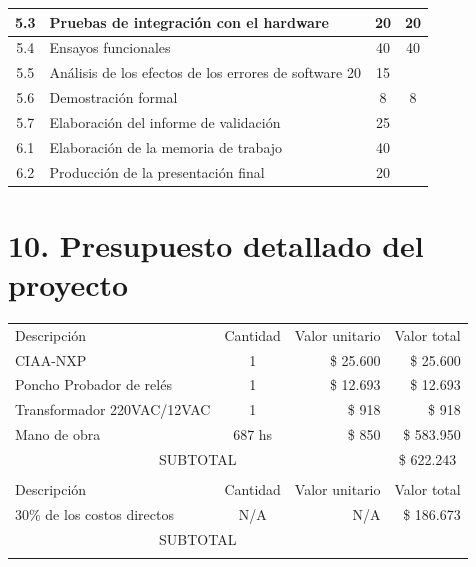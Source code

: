 \documentclass[11pt]{charter}
\begin{document}
\begin{table}[H]
\begin{tabularx}{\linewidth}{@{}|c|X|c|c|@{}}
 5.3 & Pruebas de integración con el hardware & 20 & 20 \\ \hline
 5.4 & Ensayos funcionales & 40 & 40 \\ \hline
 5.5 & Análisis de los efectos de los errores de software 20 & 15 & \\ \hline
 5.6 & Demostración formal & 8 & 8 \\ \hline
 5.7 & Elaboración del informe de validación & 25 & \\ \hline 
 6.1 & Elaboración de la memoria de trabajo & 40 & \\ \hline 
 6.2 & Producción de la presentación final & 20 & \\ \hline 
\end{tabularx}%
\end{table}


\section{10. Presupuesto detallado del proyecto}
\label{sec:presupuesto}

\begin{table}[H]
\centering
\begin{tabularx}{\linewidth}{@{}|X|c|r|r|@{}}
\hline
\rowcolor[HTML]{C0C0C0} 
\multicolumn{4}{|c|}{\cellcolor[HTML]{C0C0C0}COSTOS DIRECTOS} \\ \hline
\rowcolor[HTML]{C0C0C0} 
Descripción &
  \multicolumn{1}{c|}{\cellcolor[HTML]{C0C0C0}Cantidad} &
  \multicolumn{1}{c|}{\cellcolor[HTML]{C0C0C0}Valor unitario} &
  \multicolumn{1}{c|}{\cellcolor[HTML]{C0C0C0}Valor total} \\ \hline
CIAA-NXP                    & 1        & \$ 25.600  & \$ 25.600  \\  \hline
Poncho Probador de relés    & 1        & \$ 12.693  & \$ 12.693  \\ \hline
Transformador 220VAC/12VAC  & 1        & \$ 918     & \$ 918     \\ \hline
Mano de obra                & 687 hs   & \$ 850     & \$ 583.950 \\ \hline
\multicolumn{3}{|c|}{SUBTOTAL} &
  \multicolumn{1}{c|}{\$ 622.243} \\ \hline
\rowcolor[HTML]{C0C0C0} 
\multicolumn{4}{|c|}{\cellcolor[HTML]{C0C0C0}COSTOS INDIRECTOS} \\ \hline
\rowcolor[HTML]{C0C0C0}
Descripción &
  \multicolumn{1}{c|}{\cellcolor[HTML]{C0C0C0}Cantidad} &
  \multicolumn{1}{c|}{\cellcolor[HTML]{C0C0C0}Valor unitario} &
  \multicolumn{1}{c|}{\cellcolor[HTML]{C0C0C0}Valor total} \\ \hline
30\% de los costos directos & N/A & N/A & \$ 186.673  \\  \hline
\multicolumn{3}{|c|}{SUBTOTAL} &
  \multicolumn{1}{c|}{} \\ \hline
\rowcolor[HTML]{C0C0C0}
\multicolumn{3}{|c|}{TOTAL} &
   \\ \hline
\end{tabularx}%
\end{table}
\end{document}
